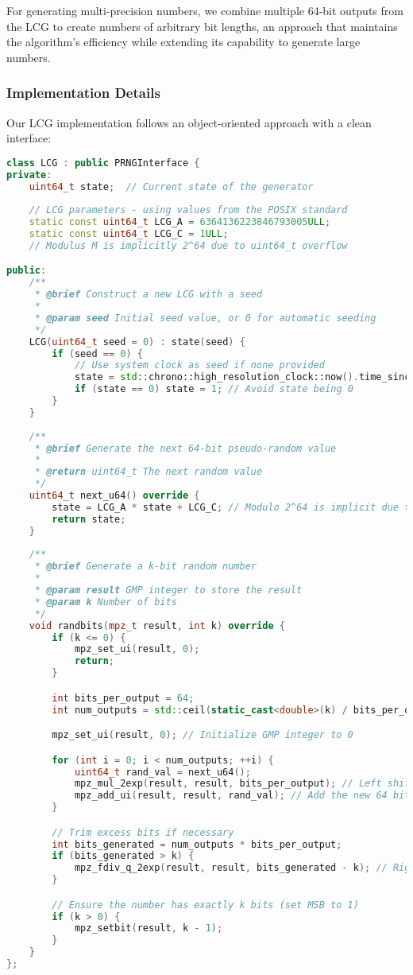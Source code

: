 For generating multi-precision numbers, we combine multiple 64-bit outputs from the LCG to create numbers of arbitrary bit lengths, an approach that maintains the algorithm's efficiency while extending its capability to generate large numbers.

\subsubsection{Implementation Details}

Our LCG implementation follows an object-oriented approach with a clean interface:

\begin{lstlisting}[language=C++, caption=LCG Implementation (Header)]
class LCG : public PRNGInterface {
private:
    uint64_t state;  // Current state of the generator
    
    // LCG parameters - using values from the POSIX standard
    static const uint64_t LCG_A = 6364136223846793005ULL;
    static const uint64_t LCG_C = 1ULL;
    // Modulus M is implicitly 2^64 due to uint64_t overflow

public:
    /**
     * @brief Construct a new LCG with a seed
     * 
     * @param seed Initial seed value, or 0 for automatic seeding
     */
    LCG(uint64_t seed = 0) : state(seed) {
        if (seed == 0) {
            // Use system clock as seed if none provided
            state = std::chrono::high_resolution_clock::now().time_since_epoch().count();
            if (state == 0) state = 1; // Avoid state being 0
        }
    }
    
    /**
     * @brief Generate the next 64-bit pseudo-random value
     * 
     * @return uint64_t The next random value
     */
    uint64_t next_u64() override {
        state = LCG_A * state + LCG_C; // Modulo 2^64 is implicit due to overflow
        return state;
    }
    
    /**
     * @brief Generate a k-bit random number
     * 
     * @param result GMP integer to store the result
     * @param k Number of bits
     */
    void randbits(mpz_t result, int k) override {
        if (k <= 0) {
            mpz_set_ui(result, 0);
            return;
        }

        int bits_per_output = 64;
        int num_outputs = std::ceil(static_cast<double>(k) / bits_per_output);

        mpz_set_ui(result, 0); // Initialize GMP integer to 0

        for (int i = 0; i < num_outputs; ++i) {
            uint64_t rand_val = next_u64();
            mpz_mul_2exp(result, result, bits_per_output); // Left shift by 64 bits
            mpz_add_ui(result, result, rand_val); // Add the new 64 bits
        }

        // Trim excess bits if necessary
        int bits_generated = num_outputs * bits_per_output;
        if (bits_generated > k) {
            mpz_fdiv_q_2exp(result, result, bits_generated - k); // Right shift
        }

        // Ensure the number has exactly k bits (set MSB to 1)
        if (k > 0) {
            mpz_setbit(result, k - 1);
        }
    }
};
\end{lstlisting}

